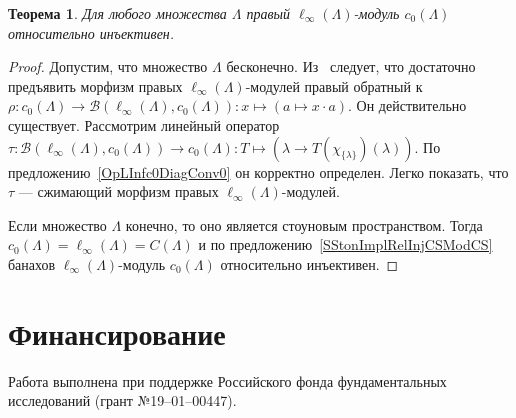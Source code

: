 \documentclass[12pt]{article}
\newtheorem{theorem}{Теорема}[section]
\begin{document}
\begin{theorem}\label{RelInjLInfModc0} Для любого множества $\Lambda$ правый
    $\ell_\infty(\Lambda)$-модуль $c_0(\Lambda)$ относительно инъективен.
\end{theorem}
\begin{proof} Допустим, что множество $\Lambda$ бесконечно. Из~\cite[предложение
        IV.1.39]{HelHomolBanTopAlg} следует, что достаточно предъявить морфизм
    правых $\ell_\infty(\Lambda)$-модулей правый обратный к
    $\rho:c_0(\Lambda)\to\mathcal{B}(\ell_\infty(\Lambda),
        c_0(\Lambda)):x\mapsto(a\mapsto x\cdot a)$. Он действительно существует.
    Рассмотрим линейный оператор $\tau:\mathcal{B}(\ell_\infty(\Lambda),
        c_0(\Lambda))\to c_0(\Lambda): T\mapsto(\lambda\to T(\chi_{ \{\lambda
            \}})(\lambda))$. По предложению~\ref{OpLInfc0DiagConv0} он корректно
    определен. Легко показать, что $\tau$ --- сжимающий морфизм правых
    $\ell_\infty(\Lambda)$-модулей.

    Если множество $\Lambda$ конечно, то оно является стоуновым пространством.
    Тогда $c_0(\Lambda)=\ell_\infty(\Lambda)=C(\Lambda)$ и по
    предложению~\ref{SStonImplRelInjCSModCS} банахов
    $\ell_\infty(\Lambda)$-модуль $c_0(\Lambda)$ относительно инъективен.
\end{proof}


\section{Финансирование}\label{SectionFunding} Работа выполнена при поддержке
Российского фонда фундаментальных исследований (грант №19--01--00447).

\end{document}
